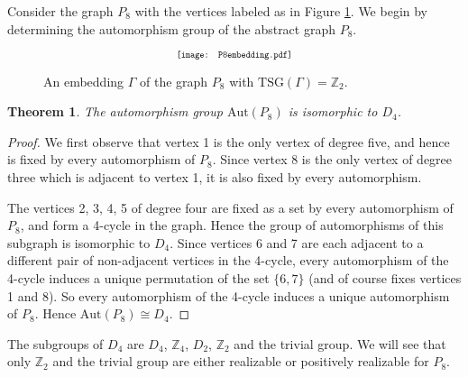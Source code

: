 \documentclass[11]{amsart}
\def\Z{\mathbb{Z}}
\def\TSG{{\mathrm{TSG}}}
\def\Aut{{\mathrm{Aut}}}
\newtheorem{theorem}{Theorem}[section]
\theoremstyle{definition}
\theoremstyle{remark}
\begin{document}
Consider the graph $P_8$ with the vertices labeled as in Figure \ref{F:P8}. We begin by determining the automorphism group of the abstract graph $P_8$.

\begin{figure} [htbp]
$$\scalebox{.7}{\texttt{[image: P8embedding.pdf]}}$$
\caption{An embedding $\Gamma$ of the graph $P_8$ with $\TSG(\Gamma) = \Z_2$.}
\label{F:P8}
\end{figure}

\begin{theorem} \label{T:P8aut}
The automorphism group $\Aut(P_8)$ is isomorphic to $D_4$.
\end{theorem}
\begin{proof}
We first observe that vertex 1 is the only vertex of degree five, and hence is fixed by every automorphism of $P_8$.  Since vertex 8 is the only vertex of degree three which is adjacent to vertex 1, it is also fixed by every automorphism.

The vertices 2, 3, 4, 5 of degree four are fixed as a set by every automorphism of $P_8$, and form a 4-cycle in the graph. Hence the group of automorphisms of this subgraph is isomorphic to $D_4$.  Since vertices 6 and 7 are each adjacent to a different pair of non-adjacent vertices in the 4-cycle, every automorphism of the 4-cycle induces a unique permutation of the set $\{6, 7\}$ (and of course fixes vertices 1 and 8). So every automorphism of the 4-cycle induces a unique automorphism of $P_8$.  Hence $\Aut(P_8) \cong D_4$.
\end{proof}

The subgroups of $D_4$ are $D_4$, $\Z_4$, $D_2$, $\Z_2$ and the trivial group. We will see that only $\Z_2$ and the trivial group are either realizable or positively realizable for $P_8$.
\end{document}

